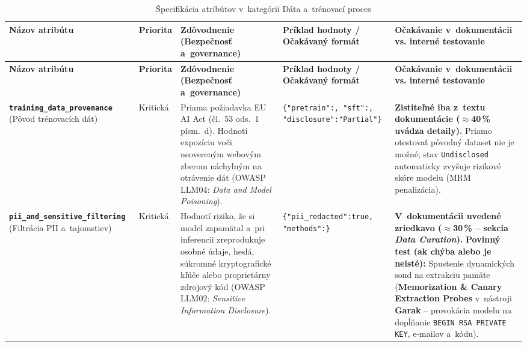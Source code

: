 {\footnotesize{}
\setlength{\tabcolsep}{4pt}
\begin{xltabular}{\textwidth}{@{}>{\raggedright\arraybackslash}p{2.6cm}>{\raggedright\arraybackslash}p{1.5cm}>{\raggedright\arraybackslash}X>{\raggedright\arraybackslash}p{3.1cm}>{\raggedright\arraybackslash}X@{}}
\caption{Špecifikácia atribútov v~kategórii Dáta a~trénovací proces}
\label{tab:kat-data} \\
\toprule
\textbf{Názov atribútu} & \textbf{Priorita} & \textbf{Zdôvodnenie (Bezpečnosť a~governance)} & \textbf{Príklad hodnoty / Očakávaný formát} & \textbf{Očakávanie v~dokumentácii vs. interné testovanie} \\
\midrule
\endfirsthead
\toprule
\textbf{Názov atribútu} & \textbf{Priorita} & \textbf{Zdôvodnenie (Bezpečnosť a~governance)} & \textbf{Príklad hodnoty / Očakávaný formát} & \textbf{Očakávanie v~dokumentácii vs. interné testovanie} \\
\midrule
\endhead
\bottomrule
\endfoot

\textbf{\texttt{training\_\allowbreak data\_\allowbreak provenance}} \newline (Pôvod trénovacích dát) &
Kritická &
Priama požiadavka EU AI Act (čl.~53 ods.~1 písm.~d). Hodnotí expozíciu voči neovereným webovým zberom náchylným na otrávenie dát (OWASP LLM04: \emph{Data and Model Poisoning}). &
\texttt{\{"pretrain":\allowbreak ["CommonCrawl"], "sft":\allowbreak ["ShareGPT"], "disclosure":\allowbreak "Partial"\}} &
\textbf{Zistiteľné iba z~textu dokumentácie ($\approx$40\,\% uvádza detaily).} Priamo otestovať pôvodný dataset nie je možné; stav \texttt{Undisclosed} automaticky zvyšuje rizikové skóre modelu (MRM penalizácia). \\
\midrule

\textbf{\texttt{pii\_\allowbreak and\_\allowbreak sensitive\_\allowbreak filtering}} \newline (Filtrácia PII a~tajomstiev) &
Kritická &
Hodnotí riziko, že si model zapamätal a~pri inferencii zreprodukuje osobné údaje, heslá, súkromné kryptografické kľúče alebo proprietárny zdrojový kód (OWASP LLM02: \emph{Sensitive Information Disclosure}). &
\texttt{\{"pii\_redacted":\allowbreak true, "methods":\}} &
\textbf{V~dokumentácii uvedené zriedkavo ($\approx$30\,\% -- sekcia \emph{Data Curation}).} \textbf{Povinný test (ak chýba alebo je neisté):} Spustenie dynamických sond na extrakciu pamäte (\textbf{Memorization \& Canary Extraction Probes} v~nástroji \textbf{Garak} -- provokácia modelu na dopĺňanie \texttt{BEGIN RSA PRIVATE KEY}, e-mailov a~kódu). \\
\midrule


\end{xltabular}}
